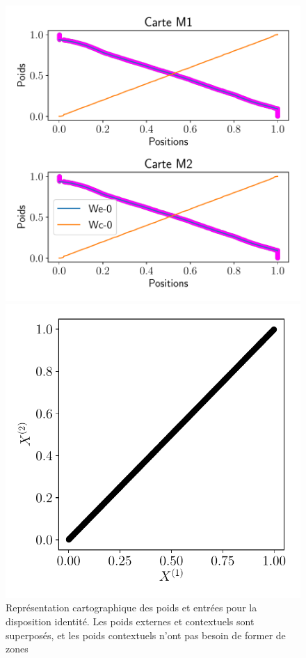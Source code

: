 \documentclass[../main]{subfiles}
\begin{document}
\begin{figure}
	\begin{minipage}{0.6\textwidth}
		\includegraphics[width=\textwidth]{2som_id_w.pdf}
	\end{minipage}
	\begin{minipage}{0.4\textwidth}
		\includegraphics[width=\textwidth]{2som_id_in}
	\end{minipage}
	\caption{Représentation cartographique des poids et entrées pour la disposition identité. Les poids externes et contextuels sont superposés, et les poids contextuels n'ont pas besoin de former de zones \label{fig:id_results}}
	\end{figure}
	
\end{document}
